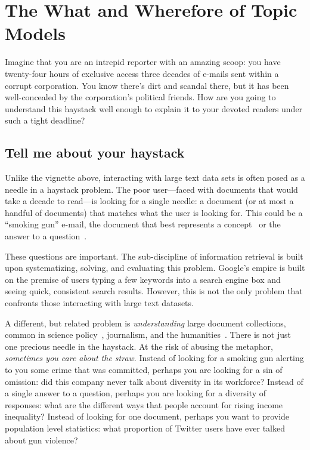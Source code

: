 
\chapter{The What and Wherefore of Topic Models}
\label{ch:intro}

Imagine that you are an intrepid reporter with an amazing scoop: you have
twenty-four hours of exclusive access three decades of e-mails sent within a
corrupt corporation.  You know there's dirt and scandal there, but it has been
well-concealed by the corporation's political friends.  How are you going to
understand this haystack well enough to explain it to your devoted readers under
such a tight deadline?

\section{Tell me about your haystack}

Unlike the vignette above, interacting with large text data sets is often posed
as a needle in a haystack problem.  The poor user---faced with documents that
would take a decade to read---is looking for a single needle: a document (or at
most a handful of documents) that matches what the user is looking for.  This
could be a ``smoking gun'' e-mail, the document that best represents a
concept~\citep{Salton-68} or the answer to a question~\citep{Hirschman-01}.

These questions are important.  The sub-discipline of information retrieval is
built upon systematizing, solving, and evaluating this problem.  Google's empire
is built on the premise of users typing a few keywords into a search engine box
and seeing quick, consistent search results.  However, this is not the only
problem that confronts those interacting with large text datasets.

A different, but related problem is \emph{understanding} large document
collections, common in science policy~\citep{talley-11}, journalism, and the
humanities~\citep{moretti-13}.  There is not just one precious needle in
the haystack.  At the risk of abusing the metaphor, \emph{sometimes you care
  about the straw}.  Instead of looking for a smoking gun alerting to you some
crime that was committed, perhaps you are looking for a sin of
omission: did this company never talk about diversity in its workforce?
Instead of a single answer to a question, perhaps you are looking for a diversity
of responses: what are the different ways that people account for rising income
inequality?  Instead of looking for one document, perhaps you want to provide
population level statistics: what proportion of Twitter users have ever talked
about gun violence?

